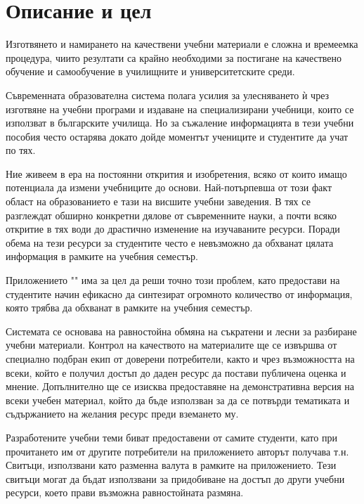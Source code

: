 \chapter{Описание и цел}

Изготвянето и намирането на качествени учебни материали
е сложна и времеемка процедура, чиито резултати са крайно
необходими за постигане на качествено обучение и 
самообучение в училищните и университетските среди.

Съвременната образователна система полага усилия за
улесняването ѝ чрез изготвяне на учебни програми и
издаване на специализирани учебници, които се използват
в българските училища. Но за съжаление информацията в
тези учебни пособия често остарява докато дойде моментът
учениците и студентите да учат по тях.

Ние живеем в ера на постоянни открития и изобретения,
всяко от които имащо потенциала да измени учебниците
до основи. Най-потърпевша от този факт област на
образованието е тази на висшите учебни заведения.
В тях се разглеждат обширно конкретни дялове от
съвременните науки, а почти всяко откритие в тях води
до драстично изменение на изучаваните ресурси.
Поради обема на тези ресурси за студентите често е
невъзможно да обхванат цялата информация в рамките на
учебния семестър.


Приложението "\appTitle{}" има за цел да реши точно този
проблем, като предостави на студентите начин ефикасно
да синтезират огромното количество от информация, която
трябва да обхванат в рамките на учебния семестър.

Системата се основава на равностойна обмяна на съкратени
и лесни за разбиране учебни материали. Контрол на
качеството на материалите ще се извършва от специално
подбран екип от доверени потребители, както и чрез
възможността на всеки, който е получил достъп до даден
ресурс да постави публичена оценка и мнение.
Допълнително ще се изисква предоставяне на демонстративна
версия на всеки учебен материал, който да бъде използван
за да се потвърди тематиката и съдържанието на желания
ресурс преди вземането му.


Разработените учебни теми биват предоставени от самите
студенти, като при прочитането им от другите потребители
на приложението авторът получава т.н. Свитъци,
използвани като разменна валута в рамките
на приложението. Тези свитъци могат да бъдат използвани
за придобиване на достъп до други учебни ресурси, което
прави възможна равностойната размяна.

